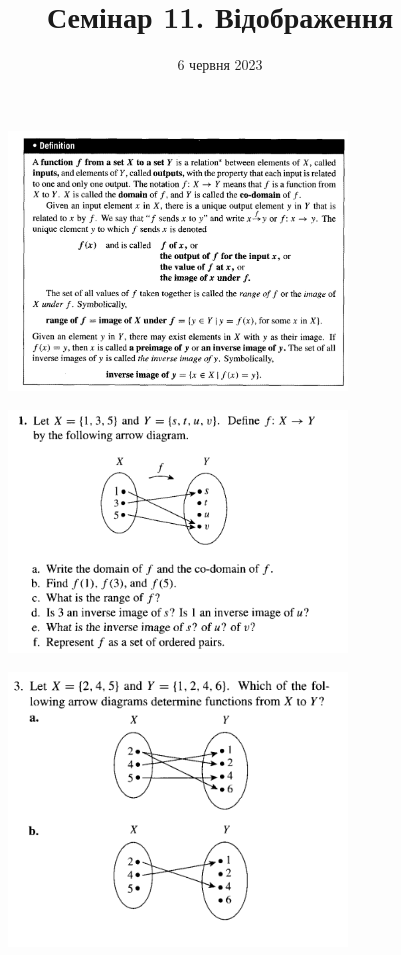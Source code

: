 \documentclass{article}
\begin{document}
\title{Семінар 11. Відображення}
\date{6 червня 2023}

\maketitle

\begin{figure}[ht!]
\centering
\includegraphics[width=90mm]{1}
\end{figure}

\begin{figure}
\centering
\includegraphics[width=90mm]{2}
\end{figure}

\begin{figure}
\centering
\includegraphics[width=90mm]{3}
\end{figure}
\end{document}
